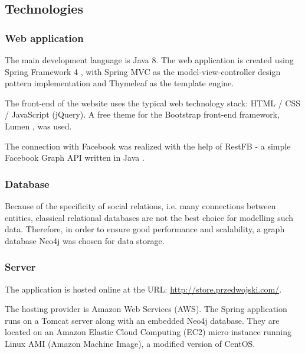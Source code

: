 \documentclass[12pt]{report}
\begin{document}
\subsection{Technologies}
\subsubsection{Web application}
The main development language is Java 8. The web application is created using Spring Framework 4 \cite{spring_framework}, with Spring MVC as the model-view-controller design pattern implementation and Thymeleaf as the template engine. 

The front-end of the website uses the typical web technology stack: HTML / CSS / JavaScript (jQuery). A free theme for the Bootstrap front-end framework, Lumen \cite{lumen}, was used.

The connection with Facebook was realized with the help of RestFB - a simple Facebook Graph API written in Java \cite{restfb}.


\subsubsection{Database}

Because of the specificity of social relations, i.e. many connections between entities, classical relational databases are not the best choice for modelling such data. Therefore, in order to ensure good performance and scalability, a graph database Neo4j \cite{neo4j} was chosen for data storage.

\subsubsection{Server}

The application is hosted online at the URL: \url{http://store.przedwojski.com/}. 

The hosting provider is Amazon Web Services (AWS). The Spring application runs on a Tomcat server along with an embedded Neo4j database. They are located on an Amazon Elastic Cloud Computing (EC2) micro instance running Linux AMI (Amazon Machine Image), a modified version of CentOS.
\end{document}
